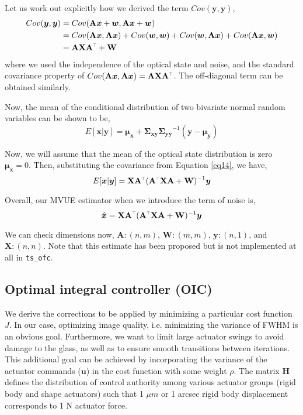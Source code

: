 \documentclass[SE,authoryear,toc]{lsstdoc}
\renewcommand{\v}[1]{\mathbf{#1}}
\newcommand{\tr}{\scalebox{0.6}{$\top$}}
\begin{document}
Let us work out explicitly how we derived the term $Cov(\bm{y}, \bm{y})$,
\begin{equation}\label{eq14}
\begin{split}
    Cov(\bm{y}, \bm{y}) & = Cov(\v{A}\bm{x} + \bm{w}, \v{A}\bm{x} + \bm{w}) \\ 
    & = Cov(\v{A}\bm{x}, \v{A}\bm{x}) + Cov(\bm{w}, \bm{w}) + Cov(\bm{w}, \v{A}\bm{x}) + Cov(\v{A}\bm{x}, \bm{w}) \\ 
    &= \v{A}\v{X}\v{A}^{\tr} + \v{W}
\end{split}
\end{equation}
where we used the independence of the optical state and noise, and the standard covariance property of $Cov(\v{A}\bm{x}, \v{A}\bm{x}) = \v{A}\v{X}\v{A}^{\tr}$. The off-diagonal term can be obtained similarly. 

Now, the mean of the conditional distribution of two bivariate normal random variables can be shown to be, 
\begin{equation}
    E[\bm{x} | \bm{y}] = \bm{\mu_x} + \v{\Sigma_{xy} } \v{\Sigma_{yy}}^{-1} (\bm{y} - \bm{\mu_y})
\end{equation}

Now, we will assume that the mean of the optical state distribution is zero $\bm{\mu_x} = 0$. Then, substituting the covariance from Equation \ref{eq14}, we have, 
\begin{equation}
    E[\bm{x} | \bm{y}] = \v{X}\v{A}^{\tr}(\v{A}^{\tr}\v{X}\v{A} + \v{W})^{-1} \bm{y}
\end{equation}

Overall, our MVUE estimator when we introduce the term of noise is, 
\begin{equation}
    \hat{\bm{x}} = \v{X}\v{A}^{\tr}(\v{A}^{\tr}\v{X}\v{A} + \v{W})^{-1} \bm{y}
\end{equation}

We can check dimensions now, $\v{A}: (n, m)$, $\v{W}: (m, m)$, $\bm{y}: (n, 1)$, and $\v{X}: (n, n)$. Note that this estimate has been proposed but is not implemented at all in \texttt{ts\_ofc}.



\subsection*{Optimal integral controller (OIC)}
We derive the corrections to be applied by minimizing a particular cost function $J$. In our case, optimizing image quality, i.e. minimizing the variance of FWHM is an obvious goal. Furthermore, we want to limit large actuator swings to avoid damage to the glass, as well as to ensure smooth transitions between iterations. This additional goal can be achieved by incorporating the variance of the actuator commands ($\bm{u}$) in the cost function with some weight $\rho$. The matrix $\v{H}$ defines the distribution of control authority among various actuator groups (rigid body and shape actuators) such that 1 $\mu m$ or 1 arcsec rigid body displacement corresponds to 1 N actuator force. 
\end{document}
